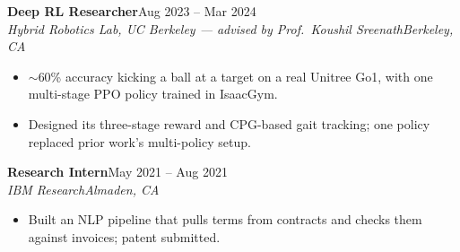 \documentclass[10pt]{article}
\newcommand{\role}[4]{\par\vspace{5pt}\textbf{#1}\hfill#2\\\textit{#3}\hfill\textit{#4}\par}
\begin{document}
\role{Deep RL Researcher}{Aug 2023 -- Mar 2024}{Hybrid Robotics Lab, UC Berkeley --- advised by Prof.\ Koushil Sreenath}{Berkeley, CA}
\begin{itemize}
\item $\sim$60\% accuracy kicking a ball at a target on a real Unitree Go1, with one multi-stage PPO policy trained in IsaacGym.
\item Designed its three-stage reward and CPG-based gait tracking; one policy replaced prior work's multi-policy setup.
\end{itemize}

\role{Research Intern}{May 2021 -- Aug 2021}{IBM Research}{Almaden, CA}
\begin{itemize}
\item Built an NLP pipeline that pulls terms from contracts and checks them against invoices; patent submitted.
\end{itemize}
\end{document}
